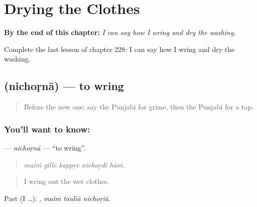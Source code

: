 
\chapter{Drying the Clothes}
\label{ch:pa-a2-drying-the-clothes}

\begin{chapteropening}
\textbf{By the end of this chapter:} \emph{I can say how I wring and dry the washing.}

Complete the last lesson of chapter 228: I can say how I wring and dry the washing.
\end{chapteropening}

\section[\texorpdfstring{\pa{ਨਿਚੋੜਨਾ} (nichoṛnā)}{ਨਿਚੋੜਨਾ (nichoṛnā)}]{ (nichoṛnā) — to wring}

\label{lesson:PA-C228-nichorna}



\begin{quote}
Before the new one: say the Punjabi for grime, then the Punjabi for a tap.
\end{quote}

\subsection*{You'll want to know: }
\textbf{} — \emph{nichoṛnā} — \textquotedblleft{}to wring\textquotedblright{}.

\begin{quote}
    
\end{quote}

\begin{quote}
\emph{maiṁ gille kappṛe nichoṛdī hāṁ.}
\end{quote}

\begin{quote}
I wring out the wet clothes.
\end{quote}

Past (I …):   , \emph{maiṁ taulīā nichoṛiā}.

